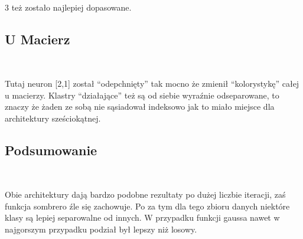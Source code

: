 \documentclass[11pt]{article}
\begin{document}
            
        
    
    

    
    \begin{center}
    \end{center}
    { \hspace*{\fill} \\}
    
    3 też zostało najlepiej dopasowane.

    \hypertarget{u-macierz}{%
\subsection{U Macierz}\label{u-macierz}}

    \begin{center}
    \end{center}
    { \hspace*{\fill} \\}
    
    Tutaj neuron {[}2,1{]} został ``odepchnięty'' tak mocno że zmienił
``kolorystykę'' całej u macierzy. Klastry ``działające'' też są od
siebie wyraźnie odseparowane, to znaczy że żaden ze sobą nie sąsiadował
indeksowo jak to miało miejsce dla architektury sześciokątnej.

    \hypertarget{podsumowanie}{%
\subsection{Podsumowanie}\label{podsumowanie}}

            
        
    

    
    \begin{center}
    \end{center}
    { \hspace*{\fill} \\}
    
    Obie architektury dają bardzo podobne rezultaty po dużej liczbie
iteracji, zaś funkcja sombrero źle się zachowuje. Po za tym dla tego
zbioru danych niektóre klasy są lepiej separowalne od innych. W
przypadku funkcji gaussa nawet w najgorszym przypadku podział był lepszy
niż losowy.
\end{document}
